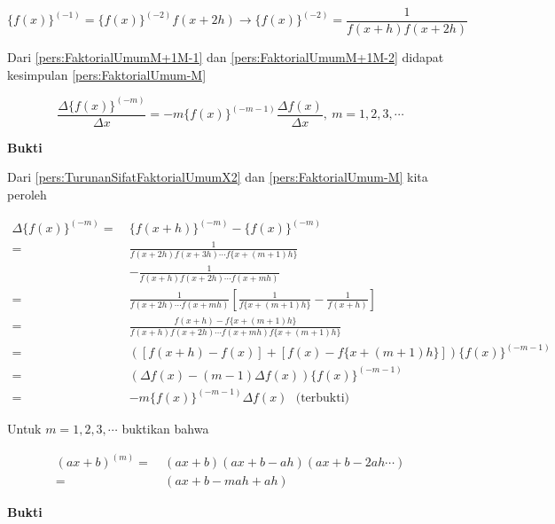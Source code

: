 \begin{equation}\label{pers:FaktorialUmumM+1M-2}
\{f(x)\}^{(-1)} = \{f(x)\}^{(-2)} f(x+2h) \rightarrow \{f(x)\}^{(-2)} = \frac{1}{f(x+h)f(x+2h)}
\end{equation}

Dari \ref{pers:FaktorialUmumM+1M-1} dan \ref{pers:FaktorialUmumM+1M-2} didapat kesimpulan \ref{pers:FaktorialUmum-M}


\begin{equation}\label{pers:f(x)^(-m)}
\boxed{\frac{\Delta \{f(x)\}^{(-m)}}{\Delta x} = -m\{f(x)\}^{(-m-1)}\frac{\Delta f(x)}{\Delta x}, ~m=1,2,3,\cdots}
\end{equation}

\textbf{Bukti}

Dari \ref{pers:TurunanSifatFaktorialUmumX2} dan \ref{pers:FaktorialUmum-M} kita peroleh

\begin{equation*}
\begin{split}
\Delta\{f(x)\}^{(-m)} =~& \{f(x+h)\}^{(-m)} - \{f(x)\}^{(-m)}\\
=~& \frac{1}{f(x+2h)f(x+3h)\cdots f\{x+(m+1)h\}} \\
& - \frac{1}{f(x+h)f(x+2h)\cdots f(x+mh)}\\
=~& \frac{1}{f(x+2h)\cdots f(x+mh)}\left[\frac{1}{f\{x+(m+1)h\}}-\frac{1}{f(x+h)}\right]\\
=~& \frac{f(x+h)-f\{x+(m+1)h\}}{f(x+h)f(x+2h)\cdots f(x+mh)f\{x+(m+1)h\}}\\
=~& \left( \left[ f(x+h)-f(x) \right] + \left[ f(x) - f\{x+(m+1)h\}\right] \right)\{f(x)\}^{(-m-1)}\\
=~& \left(\Delta f(x) - (m-1)\Delta f(x)\right)\{ f(x) \}^{(-m-1)}\\
=~& -m\{f(x)\}^{(-m-1)}\Delta f(x)~~~\text{(terbukti)}
\end{split}
\end{equation*}

\begin{exmp}\end{exmp}
Untuk $m=1,2,3,\cdots$ buktikan bahwa

\begin{equation}\label{pers:ax+b}
\boxed{
\begin{split}
(ax+b)^{(m)} =~& (ax+b)(ax+b-ah)(ax+b-2ah\cdots)\\
=~& (ax+b-mah+ah)
\end{split}
}
\end{equation}

\textbf{Bukti}

